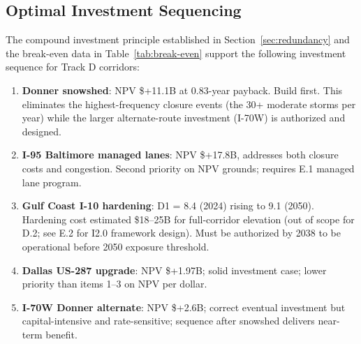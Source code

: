 \subsection{Optimal Investment Sequencing}

The compound investment principle established in Section~\ref{sec:redundancy} and the
break-even data in Table~\ref{tab:break-even} support the following investment sequence
for Track D corridors:

\begin{enumerate}
\item \textbf{Donner snowshed}: NPV \$+11.1B at 0.83-year payback. Build first. This
eliminates the highest-frequency closure events (the 30+ moderate storms per year) while
the larger alternate-route investment (I-70W) is authorized and designed.
\item \textbf{I-95 Baltimore managed lanes}: NPV \$+17.8B, addresses both closure costs
and congestion. Second priority on NPV grounds; requires E.1 managed lane program.
\item \textbf{Gulf Coast I-10 hardening}: D1 = 8.4 (2024) rising to 9.1 (2050).
Hardening cost estimated \$18--25B for full-corridor elevation (out of scope for D.2;
see E.2 for I2.0 framework design). Must be authorized by 2038 to be operational before
2050 exposure threshold.
\item \textbf{Dallas US-287 upgrade}: NPV \$+1.97B; solid investment case; lower priority
than items 1--3 on NPV per dollar.
\item \textbf{I-70W Donner alternate}: NPV \$+2.6B; correct eventual investment but
capital-intensive and rate-sensitive; sequence after snowshed delivers near-term benefit.
\end{enumerate}
